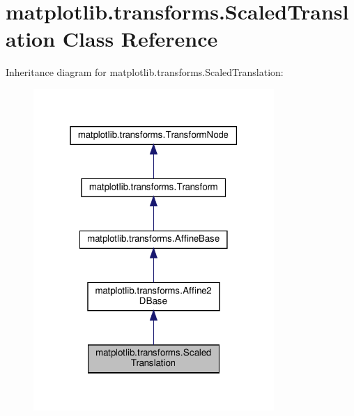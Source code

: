 \hypertarget{classmatplotlib_1_1transforms_1_1ScaledTranslation}{}\section{matplotlib.\+transforms.\+Scaled\+Translation Class Reference}
\label{classmatplotlib_1_1transforms_1_1ScaledTranslation}


Inheritance diagram for matplotlib.\+transforms.\+Scaled\+Translation\+:
\nopagebreak
\begin{figure}[H]
\begin{center}
\leavevmode
\includegraphics[width=259pt]{classmatplotlib_1_1transforms_1_1ScaledTranslation__inherit__graph}
\end{center}
\end{figure}


